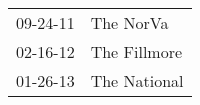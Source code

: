\begin{supertabular}{p{0.07\textwidth}p{0.23\textwidth}}
 09-24-11 &     The NorVa \\
 02-16-12 &  The Fillmore \\
 01-26-13 &  The National \\
\end{supertabular}
